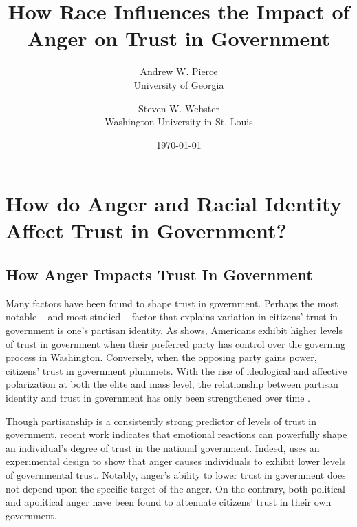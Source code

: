 \documentclass[12t, letterpaper]{article}
\author{Andrew W. Pierce \\ University of Georgia \and Steven W. Webster \\ Washington University in St. Louis}
\title{How Race Influences the Impact of Anger on Trust in Government}
\date{\today}
\begin{document}
%

\begin{titlepage}
\maketitle

\thispagestyle{empty}

\begin{singlespacing}
\end{singlespacing}

\end{titlepage}


\newpage
\setcounter{page}{1}

\doublespacing

\section{How do Anger and Racial Identity Affect Trust in Government?}
\label{sec:litreview}

\subsection{How Anger Impacts Trust In Government}
\label{subsec:angertrust}

Many factors have been found to shape trust in government. Perhaps the most notable -- and most studied -- factor that explains variation in citizens' trust in government is one's partisan identity. As \citet{citrin1974} shows, Americans exhibit higher levels of trust in government when their preferred party has control over the governing process in Washington. Conversely, when the opposing party gains power, citizens' trust in government plummets. With the rise of ideological and affective polarization at both the elite \citep{hetherington2001, fap2005} and mass \citep{abramowitz2010, bafumi_shapiro2009} level, the relationship between partisan identity and trust in government has only been strengthened over time \citep{hetherington_rudolph2015}.

Though partisanship is a consistently strong predictor of levels of trust in government, recent work indicates that emotional reactions can powerfully shape an individual's degree of trust in the national government. Indeed, \citet{webster2017} uses an experimental design to show that anger causes individuals to exhibit lower levels of governmental trust. Notably, anger's ability to lower trust in government does not depend upon the specific target of the anger. On the contrary, both political and apolitical anger have been found to attenuate citizens' trust in their own government.
\end{document}
